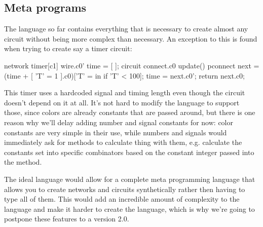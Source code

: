 \documentclass[landscape]{article}
\theoremstyle{plain}
\theoremstyle{definition}
\begin{document}
\subsection{Meta programs}
The language so far contains everything that is necessary to create almost any circuit without being more complex than necessary. An exception to this is found when trying to create say a timer circuit:
\begin{langname}
network timer[c1]
{
  wire.c0' time = [ ];
  circuit connect.c0 update()
  {
    pconnect next = (time + [ 'T' = 1 ].c0)['T' = in if 'T' < 100];
    time = next.c0';
    return next.c0;
  }
}
\end{langname}
This timer uses a hardcoded signal and timing length even though the circuit doesn't depend on it at all. It's not hard to modify the language to support those, since colors are already constants that are passed around, but there is one reason why we'll delay adding number and signal constants for now: color constants are very simple in their use, while numbers and signals would immediately ask for methods to calculate thing with them, e.g. calculate the constants set into specific combinators based on the constant integer passed into the method.

The ideal language would allow for a complete meta programming language that allows you to create networks and circuits synthetically rather then having to type all of them. This would add an incredible amount of complexity to the language and make it harder to create the language, which is why we're going to postpone these features to a version 2.0.
\end{document}
